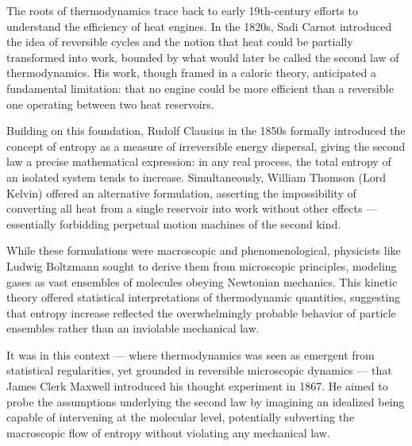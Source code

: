 \begin{historical}
The roots of thermodynamics trace back to early 19th-century efforts to understand the efficiency of heat engines. In the 1820s, Sadi Carnot introduced the idea of reversible cycles and the notion that heat could be partially transformed into work, bounded by what would later be called the second law of thermodynamics. His work, though framed in a caloric theory, anticipated a fundamental limitation: that no engine could be more efficient than a reversible one operating between two heat reservoirs.

Building on this foundation, Rudolf Clausius in the 1850s formally introduced the concept of entropy as a measure of irreversible energy dispersal, giving the second law a precise mathematical expression: in any real process, the total entropy of an isolated system tends to increase. Simultaneously, William Thomson (Lord Kelvin) offered an alternative formulation, asserting the impossibility of converting all heat from a single reservoir into work without other effects — essentially forbidding perpetual motion machines of the second kind.

While these formulations were macroscopic and phenomenological, physicists like Ludwig Boltzmann sought to derive them from microscopic principles, modeling gases as vast ensembles of molecules obeying Newtonian mechanics. This kinetic theory offered statistical interpretations of thermodynamic quantities, suggesting that entropy increase reflected the overwhelmingly probable behavior of particle ensembles rather than an inviolable mechanical law.

It was in this context — where thermodynamics was seen as emergent from statistical regularities, yet grounded in reversible microscopic dynamics — that James Clerk Maxwell introduced his thought experiment in 1867. He aimed to probe the assumptions underlying the second law by imagining an idealized being capable of intervening at the molecular level, potentially subverting the macroscopic flow of entropy without violating any mechanical law.
\end{historical}
